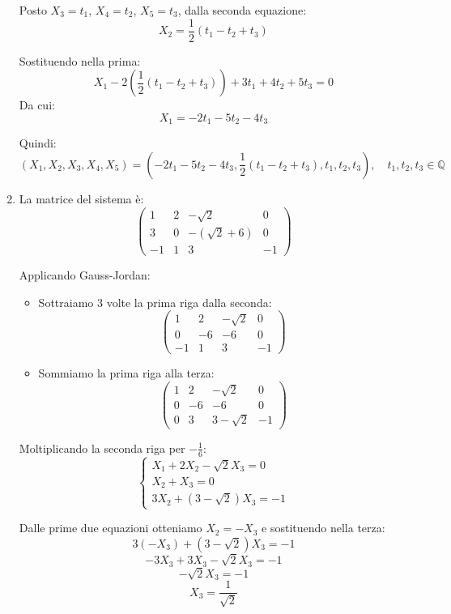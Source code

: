 \documentclass{article}
\theoremstyle{plain}
\theoremstyle{definition}
\theoremstyle{remark}
\begin{document}
\begin{enumerate}
    Posto $X_3 = t_1$, $X_4 = t_2$, $X_5 = t_3$, dalla seconda equazione:
    \[X_2 = \frac{1}{2}(t_1 - t_2 + t_3)\]
    
    Sostituendo nella prima:
    \[X_1 - 2(\frac{1}{2}(t_1 - t_2 + t_3)) + 3t_1 + 4t_2 + 5t_3 = 0\]
    Da cui:
    \[X_1 = -2t_1 - 5t_2 - 4t_3\]
    
    Quindi:
    \[\boxed{(X_1,X_2,X_3,X_4,X_5) = (-2t_1-5t_2-4t_3, \frac{1}{2}(t_1-t_2+t_3), t_1, t_2, t_3),\quad t_1,t_2,t_3 \in \mathbb{Q}}\]
    \item La matrice del sistema è:
    \[
    \begin{pmatrix}
    1 & 2 & -\sqrt{2} & 0 \\
    3 & 0 & -(\sqrt{2}+6) & 0 \\
    -1 & 1 & 3 & -1
    \end{pmatrix}
    \]
    
    Applicando Gauss-Jordan:
    \begin{itemize}
        \item Sottraiamo 3 volte la prima riga dalla seconda:
        \[
        \begin{pmatrix}
        1 & 2 & -\sqrt{2} & 0 \\
        0 & -6 & -6 & 0 \\
        -1 & 1 & 3 & -1
        \end{pmatrix}
        \]
        
        \item Sommiamo la prima riga alla terza:
        \[
        \begin{pmatrix}
        1 & 2 & -\sqrt{2} & 0 \\
        0 & -6 & -6 & 0 \\
        0 & 3 & 3-\sqrt{2} & -1
        \end{pmatrix}
        \]
    \end{itemize}
    
    Moltiplicando la seconda riga per $-\frac{1}{6}$:
    \[\begin{cases}
    X_1 + 2X_2 - \sqrt{2}X_3 = 0 \\
    X_2 + X_3 = 0 \\
    3X_2 + (3-\sqrt{2})X_3 = -1
    \end{cases}\]
    
    Dalle prime due equazioni otteniamo $X_2 = -X_3$ e sostituendo nella terza:
    \[3(-X_3) + (3-\sqrt{2})X_3 = -1\]
    \[-3X_3 + 3X_3 - \sqrt{2}X_3 = -1\]
    \[-\sqrt{2}X_3 = -1\]
    \[X_3 = \frac{1}{\sqrt{2}}\]
    

\end{enumerate}
\end{document}
